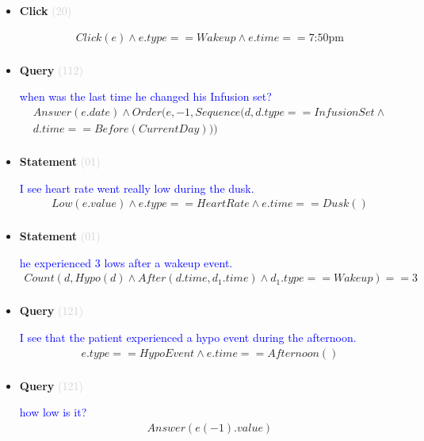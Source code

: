 \documentclass[11pt]{article}
\newcommand{\key}[1]{\textcolor{lightgray}{#1}}
\newcounter{CQuery}
\newcounter{CStatement}
\newcounter{CClick}
\begin{document}
\begin{itemize}
\item
\textbf{Click\theCClick} \key{(20)} \addtocounter{CClick}{1}
\textcolor{blue}{  }
\begin{multline*}
Click(e) \wedge e.type==Wakeup \wedge e.time==\mbox{7:50pm} \\ 
\end{multline*}


\item
\textbf{Query\theCQuery} \key{(112)} \addtocounter{CQuery}{1}
\textcolor{blue}{ when was the last time he changed his Infusion set? }
\begin{multline*}
Answer(e.date) \wedge Order(e, -1, Sequence(d, d.type==InfusionSet\wedge \\ 
d.time==Before(CurrentDay))) \\ 
\end{multline*}


\item
\textbf{Statement\theCStatement} \key{(01)} \addtocounter{CStatement}{1}
\textcolor{blue}{ I see heart rate went really low during the dusk. }
\begin{multline*}
Low(e.value) \wedge e.type==HeartRate \wedge e.time==Dusk() \\ 
\end{multline*}


\item
\textbf{Statement\theCStatement} \key{(01)} \addtocounter{CStatement}{1}
\textcolor{blue}{ he experienced 3 lows after a wakeup event. }
\begin{multline*}
Count(d, Hypo(d) \wedge After(d.time, d_1.time) \wedge d_1.type==Wakeup)==3 \\ 
\end{multline*}


\item
\textbf{Query\theCQuery} \key{(121)} \addtocounter{CQuery}{1}
\textcolor{blue}{ I see that the patient experienced a hypo event during the afternoon. }
\begin{multline*}
e.type==HypoEvent \wedge e.time==Afternoon() \\ 
\end{multline*}


\item
\textbf{Query\theCQuery} \key{(121)} \addtocounter{CQuery}{1}
\textcolor{blue}{ how low is it? }
\begin{multline*}
Answer(e(-1).value) \\ 
\end{multline*}



\end{itemize}
\end{document}
